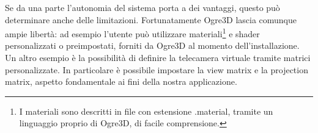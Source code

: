 Se da una parte l'autonomia del sistema porta a dei vantaggi, questo può determinare anche delle limitazioni. Fortunatamente Ogre3D lascia comunque ampie libertà: ad esempio l'utente può utilizzare materiali\footnote{I materiali sono descritti in file con estensione .material, tramite un linguaggio proprio di Ogre3D, di facile comprensione.} e shader personalizzati o preimpostati, forniti da Ogre3D al momento dell'installazione. Un altro esempio è la possibilità di definire la telecamera virtuale tramite matrici personalizzate. In particolare è possibile impostare la view matrix e la projection matrix, aspetto fondamentale ai fini della nostra applicazione. 
%
%
%
%
%
%
%
